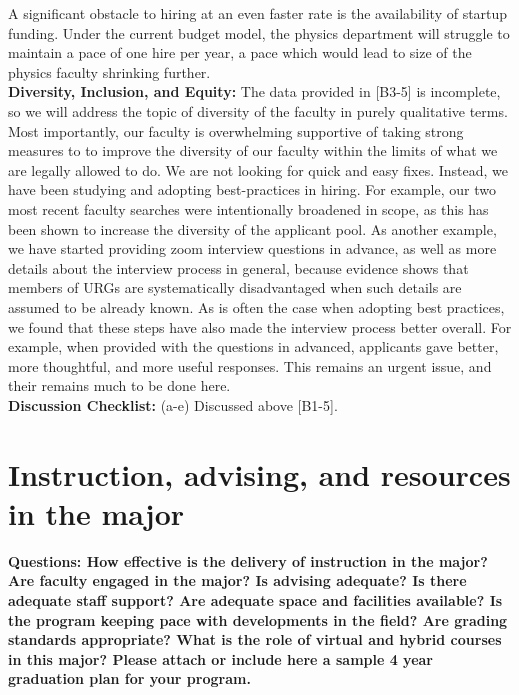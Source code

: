 \documentclass[12pt]{article}
\begin{document}
A significant obstacle to hiring at an even faster rate is the
availability of startup funding.  Under the current budget model, the
physics department will struggle to maintain a pace of one hire per
year, a pace which would lead to size of the physics faculty shrinking
further.\\[3pt]

\noindent
{\bf Diversity, Inclusion, and Equity:} The data provided in [B3-5] is
incomplete, so we will address the topic of diversity of the faculty
in purely qualitative terms.  Most importantly, our faculty is
overwhelming supportive of taking strong measures to to improve the
diversity of our faculty within the limits of what we are legally
allowed to do.  We are not looking for quick and easy fixes.  Instead,
we have been studying and adopting best-practices in hiring.  For
example, our two most recent faculty searches were intentionally
broadened in scope, as this has been shown to increase the diversity
of the applicant pool.  As another example, we have started providing
zoom interview questions in advance, as well as more details about the
interview process in general, because evidence shows that members of
URGs are systematically disadvantaged when such details are assumed to
be already known.  As is often the case when adopting best practices,
we found that these steps have also made the interview process better
overall. For example, when provided with the questions in advanced,
applicants gave better, more thoughtful, and more useful responses.
This remains an urgent issue, and their remains much to be done here.\\[3pt]

\noindent
{\bf Discussion Checklist:} (a-e) Discussed above [B1-5].
    
\section{Instruction, advising, and resources in the major}
\label{sec:instruction}

{\bf Questions: How effective is the delivery of instruction in the major? Are faculty engaged in the major? Is advising adequate? Is there adequate staff support? Are adequate space and facilities available? Is the program keeping pace with developments in the field? Are grading standards appropriate? What is the role of virtual and hybrid courses in this major? Please attach or include here a sample 4 year graduation plan for your program.}\\[3pt]
\end{document}
